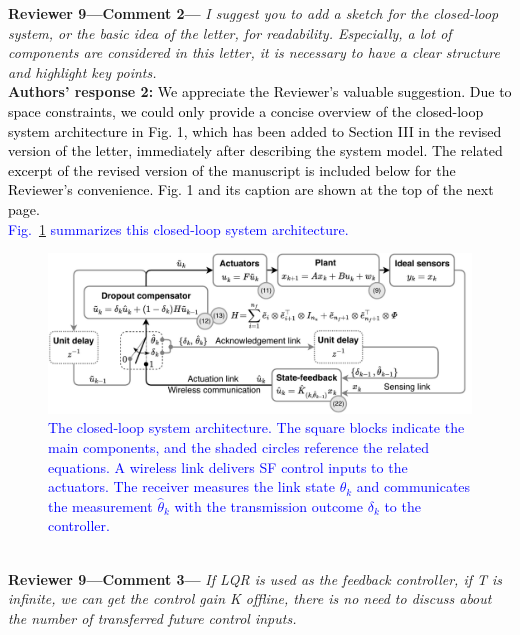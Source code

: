 \textbf{Reviewer 9—Comment 2—}\textit{%
I suggest you to add a sketch for the closed-loop system, or the basic idea of the letter, for readability. Especially, a lot of components are considered in this letter, it is necessary to have a clear structure and highlight key points.}\\[2mm]
\textbf{Authors' response 2:} \textcolor{black}{We appreciate the Reviewer's valuable suggestion. Due to space constraints, we could only provide a concise overview of the closed-loop system architecture in Fig. 1, which has been added to Section III in the revised version of the letter, immediately after describing the system model. The related excerpt of the revised version of the manuscript is included below for the Reviewer's convenience.  Fig. 1 and its caption are shown at the top of the next page.}\\
\textcolor{blue}{Fig.~\ref{fig:architecture} summarizes this closed-loop system architecture.}
\begin{figure}
\begin{center}
\vspace{5pt}\includegraphics[width=0.8\columnwidth]{../wncs-lcss-cdc-25-architecture.pdf}
\caption{\textcolor{blue}{The closed-loop system architecture. The square blocks indicate the main components, and the shaded circles reference the related equations. A wireless link delivers SF control inputs to the actuators. The receiver measures the link state $\theta_k$ and communicates the measurement $\hat{\theta}_k$ with the transmission outcome $\delta_k$ to the controller. }}\label{fig:architecture}
\end{center}
\end{figure}
\\[4mm]
\textbf{Reviewer 9—Comment 3—}\textit{%
If LQR is used as the feedback controller, if T is infinite, we can get the control gain K offline, there is no need to discuss about the number of transferred future control inputs.}\\[2mm]
